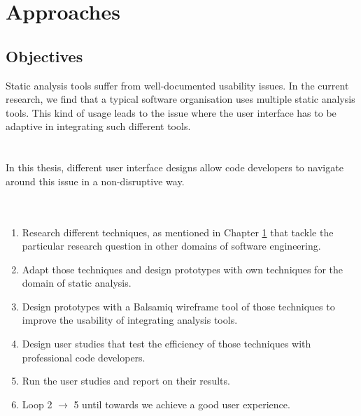 \chapter{Approaches}
\label{ch:approaches_report}

\section{Objectives}
\label{ch:objectives_report}

Static analysis tools suffer from well-documented usability issues. \cite{CB16,JSMB13} In the current research, we find that a typical software organisation uses multiple static analysis tools. This kind of usage leads to the issue where the user interface has to be adaptive in integrating such different tools. \\ \\ \\


In this thesis, different user interface designs allow code developers to navigate around this issue in a non-disruptive way. \\ \\ \\

\begin{enumerate}
	
	\item  Research different techniques, as mentioned in Chapter \ref{ch:approaches_report} that tackle the particular research question in other domains of software engineering.
	
	\item  Adapt those techniques and design prototypes with own techniques for the domain of static analysis.
	
	\item  Design prototypes with a Balsamiq wireframe tool \cite{B} of those techniques to improve the usability of integrating analysis tools.
	
	\item  Design user studies that test the efficiency of those techniques with professional code developers.
	
	\item  Run the user studies and report on their results.
	
	\item  Loop 2 $\rightarrow$ 5 until towards we achieve a good user experience.
\end{enumerate}

